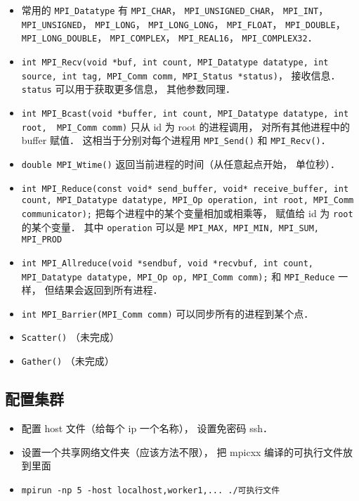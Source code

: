 \begin{itemize}
\item 常用的 \verb|MPI_Datatype| 有 \verb|MPI_CHAR|， \verb|MPI_UNSIGNED_CHAR|， \verb|MPI_INT|， \verb|MPI_UNSIGNED|， \verb|MPI_LONG|， \verb|MPI_LONG_LONG|， \verb|MPI_FLOAT|， \verb|MPI_DOUBLE|， \verb|MPI_LONG_DOUBLE|， \verb|MPI_COMPLEX|， \verb|MPI_REAL16|， \verb|MPI_COMPLEX32|．
\item \verb|int MPI_Recv(void *buf, int count, MPI_Datatype datatype, int source, int tag, MPI_Comm comm, MPI_Status *status)|， 接收信息． \verb|status| 可以用于获取更多信息， 其他参数同理．
\item \verb|int MPI_Bcast(void *buffer, int count, MPI_Datatype datatype, int root,  MPI_Comm comm)| 只从 id 为 root 的进程调用， 对所有其他进程中的 buffer 赋值． 这相当于分别对每个进程用 \verb|MPI_Send()| 和 \verb|MPI_Recv()|．
\item \verb|double MPI_Wtime()| 返回当前进程的时间（从任意起点开始， 单位秒）．
\item \verb|int MPI_Reduce(const void* send_buffer, void* receive_buffer, int count, MPI_Datatype datatype, MPI_Op operation, int root, MPI_Comm communicator);| 把每个进程中的某个变量相加或相乘等， 赋值给 id 为 \verb|root| 的某个变量． 其中 \verb|operation| 可以是 \verb|MPI_MAX, MPI_MIN, MPI_SUM, MPI_PROD|
\item \verb|int MPI_Allreduce(void *sendbuf, void *recvbuf, int count, MPI_Datatype datatype, MPI_Op op, MPI_Comm comm);| 和 \verb|MPI_Reduce| 一样， 但结果会返回到所有进程．
\item \verb|int MPI_Barrier(MPI_Comm comm)| 可以同步所有的进程到某个点．
\item \verb|Scatter()| （未完成）
\item \verb|Gather()| （未完成）
\end{itemize}

\subsection{配置集群}
\begin{itemize}
\item 配置 host 文件（给每个 ip 一个名称）， 设置免密码 ssh．
\item 设置一个共享网络文件夹（应该方法不限）， 把 mpicxx 编译的可执行文件放到里面
\item \verb|mpirun -np 5 -host localhost,worker1,... ./可执行文件|
\end{itemize}
